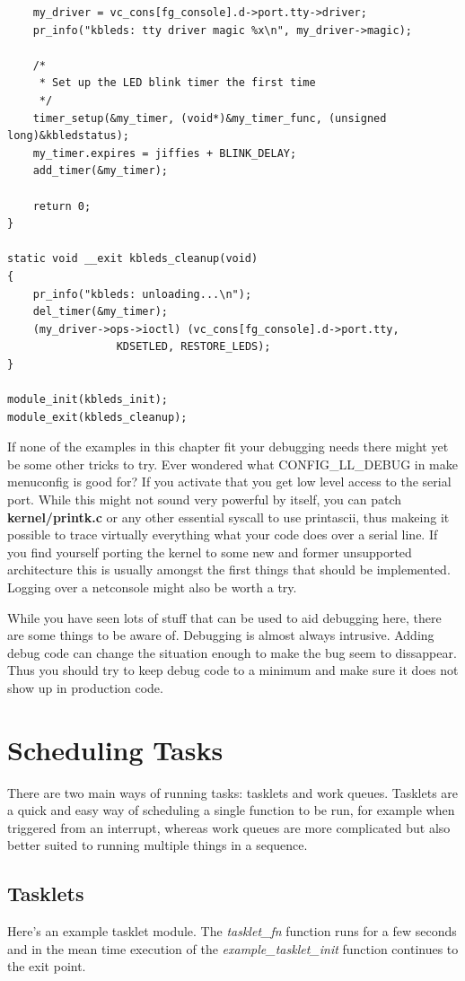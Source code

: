 \documentclass[11pt]{article}
\begin{document}
\begin{verbatim}
    my_driver = vc_cons[fg_console].d->port.tty->driver;
    pr_info("kbleds: tty driver magic %x\n", my_driver->magic);

    /*
     * Set up the LED blink timer the first time
     */
    timer_setup(&my_timer, (void*)&my_timer_func, (unsigned long)&kbledstatus);
    my_timer.expires = jiffies + BLINK_DELAY;
    add_timer(&my_timer);

    return 0;
}

static void __exit kbleds_cleanup(void)
{
    pr_info("kbleds: unloading...\n");
    del_timer(&my_timer);
    (my_driver->ops->ioctl) (vc_cons[fg_console].d->port.tty,
			     KDSETLED, RESTORE_LEDS);
}

module_init(kbleds_init);
module_exit(kbleds_cleanup);
\end{verbatim}

If none of the examples in this chapter fit your debugging needs there might yet be some other tricks to try. Ever wondered what CONFIG\_LL\_DEBUG in make menuconfig is good for? If you activate that you get low level access to the serial port. While this might not sound very powerful by itself, you can patch \textbf{kernel/printk.c} or any other essential syscall to use printascii, thus makeing it possible to trace virtually everything what your code does over a serial line. If you find yourself porting the kernel to some new and former unsupported architecture this is usually amongst the first things that should be implemented. Logging over a netconsole might also be worth a try.

While you have seen lots of stuff that can be used to aid debugging here, there are some things to be aware of. Debugging is almost always intrusive. Adding debug code can change the situation enough to make the bug seem to dissappear. Thus you should try to keep debug code to a minimum and make sure it does not show up in production code.

\section{Scheduling Tasks}
\label{sec:org4fbdf99}
There are two main ways of running tasks: tasklets and work queues. Tasklets are a quick and easy way of scheduling a single function to be run, for example when triggered from an interrupt, whereas work queues are more complicated but also better suited to running multiple things in a sequence.

\subsection{Tasklets}
\label{sec:org1278d27}
Here's an example tasklet module. The \emph{tasklet\_fn} function runs for a few seconds and in the mean time execution of the \emph{example\_tasklet\_init} function continues to the exit point.
\end{document}
